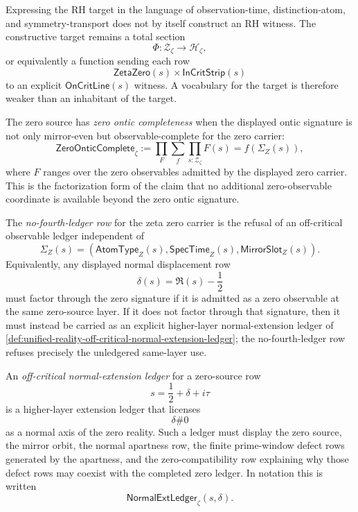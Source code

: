 \begin{principle}
\label{prin:unified-reality-expression-not-construction}
Expressing the RH target in the language of observation-time,
distinction-atom, and symmetry-transport does not by itself construct an
RH witness.  The constructive target remains a total section
$$
\Phi:
\mathcal Z_{\zeta}
\to
\mathcal H_{\zeta},
$$
or equivalently a function sending each row
$$
\mathsf{ZetaZero}(s)\times\mathsf{InCritStrip}(s)
$$
to an explicit $\mathsf{OnCritLine}(s)$ witness.  A vocabulary for the
target is therefore weaker than an inhabitant of the target.
\end{principle}

\begin{definition}
\label{def:unified-reality-zero-ontic-completeness}
The zero source has \emph{zero ontic completeness} when the displayed
ontic signature is not only mirror-even but observable-complete for the
zero carrier:
$$
\mathsf{ZeroOnticComplete}_{\zeta}
:=
\prod_F
\sum_f
\prod_{s:\mathcal Z_{\zeta}}
F(s)=f(\Sigma_Z(s)),
$$
where $F$ ranges over the zero observables admitted by the displayed
zero carrier.  This is the factorization form of the claim that no
additional zero-observable coordinate is available beyond the zero
ontic signature.
\end{definition}

\begin{definition}
\label{def:unified-reality-no-fourth-ledger-row}
The \emph{no-fourth-ledger row} for the zeta zero carrier is the refusal
of an off-critical observable ledger independent of
$$
\Sigma_Z(s)
=
(\mathsf{AtomType}_Z(s),\mathsf{SpecTime}_Z(s),
\mathsf{MirrorSlot}_Z(s)).
$$
Equivalently, any displayed normal displacement row
$$
\delta(s)=\Re(s)-\frac12
$$
must factor through the zero signature if it is admitted as a zero
observable at the same zero-source layer.  If it does not factor
through that signature, then it must instead be carried as an explicit
higher-layer normal-extension ledger of
\autoref{def:unified-reality-off-critical-normal-extension-ledger}; the
no-fourth-ledger row refuses precisely the unledgered same-layer use.
\end{definition}

\begin{definition}
\label{def:unified-reality-off-critical-normal-extension-ledger}
An \emph{off-critical normal-extension ledger} for a zero-source row
$$
s=\frac12+\delta+i\tau
$$
is a higher-layer extension ledger that licenses
$$
\delta\#0
$$
as a normal axis of the zero reality.  Such a ledger must display the
zero source, the mirror orbit, the normal apartness row, the finite
prime-window defect rows generated by the apartness, and the
zero-compatibility row explaining why those defect rows may coexist with
the completed zero ledger.  In notation this is written
$$
\mathsf{NormalExtLedger}_{\zeta}(s,\delta).
$$
\end{definition}


